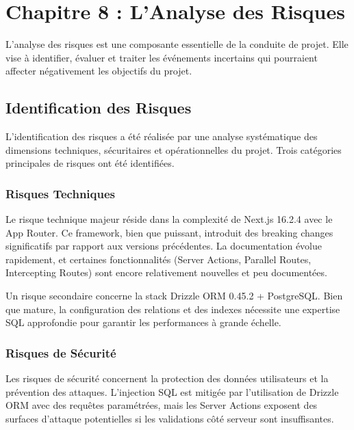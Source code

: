
\section{Chapitre 8 : L'Analyse des Risques}



L'analyse des risques est une composante essentielle de la conduite de projet. Elle vise à identifier, évaluer et traiter les événements incertains qui pourraient affecter négativement les objectifs du projet.



\subsection{Identification des Risques}



L'identification des risques a été réalisée par une analyse systématique des dimensions techniques, sécuritaires et opérationnelles du projet. Trois catégories principales de risques ont été identifiées.



\subsubsection{Risques Techniques}



Le risque technique majeur réside dans la complexité de Next.js 16.2.4 avec le App Router. Ce framework, bien que puissant, introduit des breaking changes significatifs par rapport aux versions précédentes. La documentation évolue rapidement, et certaines fonctionnalités (Server Actions, Parallel Routes, Intercepting Routes) sont encore relativement nouvelles et peu documentées.



Un risque secondaire concerne la stack Drizzle ORM 0.45.2 + PostgreSQL. Bien que mature, la configuration des relations et des indexes nécessite une expertise SQL approfondie pour garantir les performances à grande échelle.



\subsubsection{Risques de Sécurité}



Les risques de sécurité concernent la protection des données utilisateurs et la prévention des attaques. L'injection SQL est mitigée par l'utilisation de Drizzle ORM avec des requêtes paramétrées, mais les Server Actions exposent des surfaces d'attaque potentielles si les validations côté serveur sont insuffisantes.



